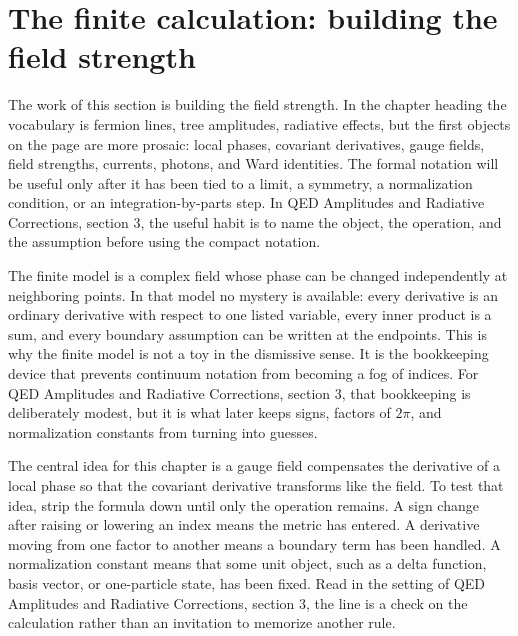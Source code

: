 \section{The finite calculation: building the field strength}













The work of this section is building the field strength.  In the chapter heading the vocabulary is fermion lines, tree amplitudes, radiative effects, but the first objects on the page are more prosaic: local phases, covariant derivatives, gauge fields, field strengths, currents, photons, and Ward identities.  The formal notation will be useful only after it has been tied to a limit, a symmetry, a normalization condition, or an integration-by-parts step.  In QED Amplitudes and Radiative Corrections, section 3, the useful habit is to name the object, the operation, and the assumption before using the compact notation.

The finite model is a complex field whose phase can be changed independently at neighboring points.  In that model no mystery is available: every derivative is an ordinary derivative with respect to one listed variable, every inner product is a sum, and every boundary assumption can be written at the endpoints.  This is why the finite model is not a toy in the dismissive sense.  It is the bookkeeping device that prevents continuum notation from becoming a fog of indices.  For QED Amplitudes and Radiative Corrections, section 3, that bookkeeping is deliberately modest, but it is what later keeps signs, factors of \(2\pi\), and normalization constants from turning into guesses.

The central idea for this chapter is a gauge field compensates the derivative of a local phase so that the covariant derivative transforms like the field.  To test that idea, strip the formula down until only the operation remains.  A sign change after raising or lowering an index means the metric has entered.  A derivative moving from one factor to another means a boundary term has been handled.  A normalization constant means that some unit object, such as a delta function, basis vector, or one-particle state, has been fixed.  Read in the setting of QED Amplitudes and Radiative Corrections, section 3, the line is a check on the calculation rather than an invitation to memorize another rule.

